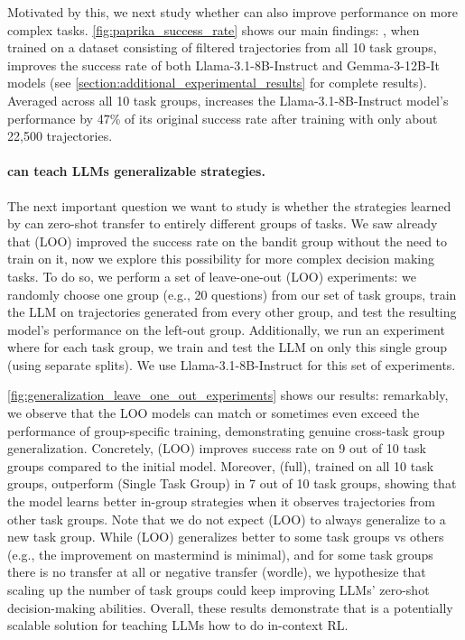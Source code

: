 Motivated by this, we next study whether \ours{} can also improve performance on more complex tasks. \cref{fig:paprika_success_rate} shows our main findings: \ours{}, when trained on a dataset consisting of filtered trajectories from all 10 task groups, improves the success rate of both Llama-3.1-8B-Instruct and Gemma-3-12B-It models (see \cref{section:additional_experimental_results} for complete results).
Averaged across all 10 task groups, \ours{} increases the Llama-3.1-8B-Instruct model's performance by 47\% of its original success rate after training with only about 22,500 trajectories.

\paragraph{\ours{} can teach LLMs generalizable strategies.}

The next important question we want to study is whether the strategies learned by \ours{} can zero-shot transfer to entirely different groups of tasks. We saw already that \ours{} (LOO) improved the success rate on the bandit group without the need to train on it, now we explore this possibility for more complex decision making tasks. To do so, we perform a set of leave-one-out (LOO) experiments: we randomly choose one group (e.g., 20 questions) from our set of task groups, train the LLM on trajectories generated from every other group, and test the resulting model's performance on the left-out group. 
Additionally, we run an experiment where for each task group, we train and test the LLM on only this single group (using separate splits). We use Llama-3.1-8B-Instruct for this set of experiments.

\cref{fig:generalization_leave_one_out_experiments} shows our results: remarkably, we observe that the LOO models can match or sometimes even exceed the performance of group-specific training, demonstrating genuine cross-task group generalization. Concretely, \ours{} (LOO) improves success rate on 9 out of 10 task groups compared to the initial model. Moreover, \ours{} (full), trained on all 10 task groups, outperform \ours{} (Single Task Group) in 7 out of 10 task groups, showing that the model learns better in-group strategies when it observes trajectories from other task groups. Note that we do not expect \ours{} (LOO) to always generalize to a new task group. While \ours{} (LOO) generalizes better to some task groups vs others (e.g., the improvement on mastermind is minimal), and for some task groups there is no transfer at all or negative transfer (wordle), we hypothesize that scaling up the number of task groups could keep improving LLMs' zero-shot decision-making abilities. Overall, these results demonstrate that \ours{} is a potentially scalable solution for teaching LLMs how to do in-context RL.

